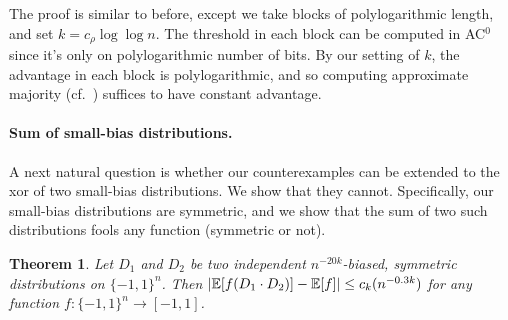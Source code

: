 \documentclass[10pt,a4paper]{article}
\newtheorem{theorem}{Theorem}%
\newtheorem{corollary}[theorem]{Corollary}
\theoremstyle{definition}
\renewcommand{\Pr}{\mathop{\mathbb{P}\/}}
\newcommand{\E}{\mathop{\mathbb{E}\/}}
\newcommand{\poly}{\textnormal{poly}}
\newcommand{\pmo}{\{-1,1\}}
\DeclarePairedDelimiter\abs{\lvert}{\rvert}
\newcommand{\summ}[1]{%
  \begingroup\noexpandarg
  \StrLen{#1}[\temp]%
  1^\top
  \ifnum\temp>1
    (#1)%
  \else
    #1%
  \fi 
  \endgroup
}
\newcommand{\peter}[1]{\footnote{{\bf \color{green}Peter}: {#1}}}
\newcommand{\peter}[1]{}
\begin{document}
The proof is similar to before, except we take blocks of polylogarithmic length, and set $k = c_\rho \log \log n$.  The threshold in each block can be computed in AC$^0$ since it's only on polylogarithmic number of bits.  By our setting of $k$, the advantage in each block is polylogarithmic, and so computing approximate majority \cite{Ajt83} (cf.~\cite{ViolaBPvsE}) suffices to have constant advantage.

%
%
%
%
%
%
%
%
%

\paragraph{Sum of small-bias distributions.}
%
A next natural question is whether our counterexamples can be extended to the xor of two small-bias distributions.  We show that they cannot.  Specifically, our small-bias distributions are symmetric, and we show that the sum of two such distributions fools any function (symmetric or not).

\begin{theorem} \label{thm:sym-xor-sym-fools-any}
Let $D_1$ and $D_2$ be two independent $n^{-20k}$-biased, symmetric distributions on $\pmo^n$.
Then $\abs{\E[f(D_1 \cdot D_2)] - \E[f]} \le c_k(n^{-0.3k})$ for any function $f\colon\pmo^n \to [-1,1]$.
\end{theorem}
\end{document}
